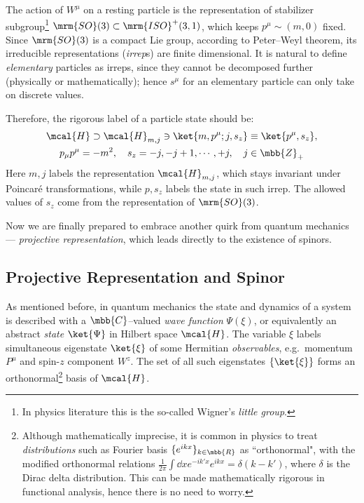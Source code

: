 \documentclass[a4paper,11pt]{article}
\begin{document}
	The action of $W^\mu$ on a resting particle is the representation of stabilizer subgroup\footnote{
		In physics literature this is the so-called Wigner's \textit{little group}.
	} $\mrm{SO}(3)\subset\mrm{ISO}^+(3,1)$, which keeps $p^\mu \sim (m,0)$ fixed. Since $\mrm{SO}(3)$ is a compact Lie group, according to Peter--Weyl theorem, its irreducible representations (\textit{irrep}s) are finite dimensional. It is natural to define \textit{elementary} particles as irreps, since they cannot be decomposed further (physically or mathematically); hence $s^\mu$ for an elementary particle can only take on discrete values. 
	
	Therefore, the rigorous label of a particle state should be:
	\begin{equation}
	\begin{gathered}
		\mcal{H}\supset\mcal{H}_{m,j}
			\ni\ket{m,p^\mu;j,s_z}
		\equiv\ket{p^\mu,s_z},\\
		p_\mu p^\mu = -m^2,\quad
		s_z = -j, -j+1,\cdots, +j,\quad
		j \in\mbb{Z}_+
	\end{gathered}
	\label{eq:particle_repr}
	\end{equation}
	Here $m,j$ labels the representation $\mcal{H}_{m,j}$, which stays invariant under Poincar\'e transformations, while $p,s_z$ labels the state in such irrep. The allowed values of $s_z$ come from the representation of $\mrm{SO}(3)$. 
	
	Now we are finally prepared to embrace another quirk from quantum mechanics --- \textit{projective representation}, which leads directly to the existence of spinors. 
\subsection{Projective Representation and Spinor}
	As mentioned before, in quantum mechanics the state and dynamics of a system is described with a $\mbb{C}$--valued \textit{wave function} $\Psi(\xi)$, or equivalently an abstract \textit{state} $\ket{\Psi}$ in Hilbert space $\mcal{H}$. The variable $\xi$ labels simultaneous eigenstate $\ket{\xi}$ of some Hermitian \textit{observables}, e.g.~momentum $P^\mu$ and spin-$z$ component $W^z$. The set of all such eigenstates $\{\ket{\xi}\}$ forms an orthonormal\footnote{
		Although mathematically imprecise, it is common in physics to treat \textit{distributions} such as Fourier basis $\{e^{ikx}\}_{k\in\mbb{R}}$ as ``orthonormal", with the modified orthonormal relations $\frac{1}{2\pi} \int\dd{x} e^{-ik'x}e^{ikx} = \delta(k-k')$, where $\delta$ is the Dirac delta distribution. This can be made mathematically rigorous in functional analysis, hence there is no need to worry. 
	} basis of $\mcal{H}$. 
	
\end{document}
